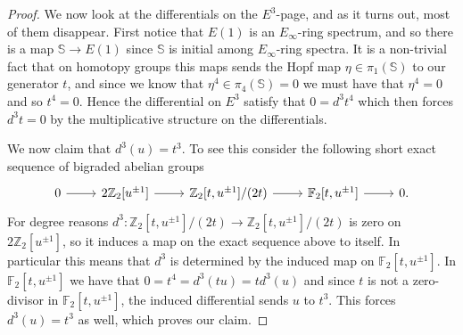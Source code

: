 \documentclass[a4paper]{article} %
\theoremstyle{definition}
\newcommand{\Z}{\mathbb{Z}}
\newcommand{\F}{\mathbb{F}}
\newcommand{\Sph}{\mathbb{S}}
\begin{document}
\begin{proof}
We now look at the differentials on the $E^3$-page, and as it turns out, most of them disappear. First notice that $E(1)$ is an $E_\infty$-ring spectrum, and so there is a map $\Sph \to E(1)$ since $\Sph$ is initial among $E_\infty$-ring spectra. It is a non-trivial fact that on homotopy groups this maps sends the Hopf map $\eta \in \pi_1(\Sph)$ to our generator $t$, and since we know that $\eta^4 \in \pi_4(\Sph) = 0$ we must have that $\eta^4 = 0$ and so $t^4 = 0$. Hence the differential on $E^3$ satisfy that $0 = d^3 t^4$
which then forces $d^3t = 0$ by the multiplicative structure on the differentials.

 We now claim that $d^3(u) = t^3$. To see this consider the following short exact sequence of bigraded abelian groups
 \[
\begin{tikzcd}
  0 \rar & 2\Z_2[u^{\pm 1}] \rar & \Z_2[t, u^{\pm 1}]/(2t) \rar & \F_2[t, u^{\pm 1}] \rar & 0.
\end{tikzcd}
 \]
 For degree reasons $d^3 \colon \Z_2[t, u^{\pm 1}]/(2t) \to \Z_2[t, u^{\pm 1}]/(2t)$ is zero on $2\Z_2[u^{\pm 1}]$, so it induces a map on the exact sequence above to itself. In particular this means that $d^3$ is determined by the induced map on $\F_2[t, u^{\pm 1}]$. In $\F_2[t, u^{\pm 1}]$ we have that $0 = t^4 = d^3(tu) = t d^3(u)$ and since
 $t$ is not a zero-divisor in $\F_2[t, u^{\pm 1}]$,
 the induced differential sends $u$ to $t^3$. This forces $d^3(u) = t^3$ as well, which proves our claim.



\end{proof}
\end{document}
